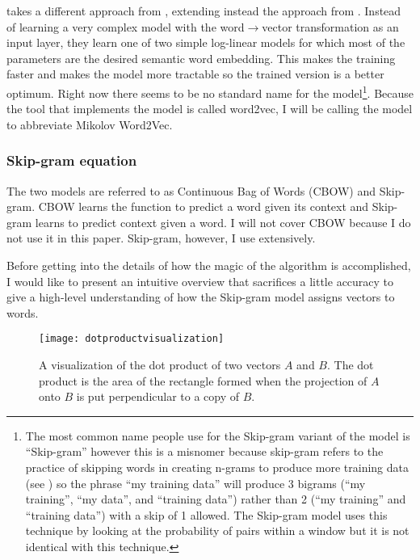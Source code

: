 \citep{Mikolov2013b} takes a different approach from \citep{Bengio2003},
extending instead the approach from \citep{Mikolov2007}. 
Instead of learning a very 
complex model with the word$\rightarrow$vector transformation as an input layer, they
learn one of two simple log-linear models for which most of the parameters
are the desired semantic word embedding. This makes the training faster and
makes the model more tractable so the trained version is a better optimum.
Right now there seems to be no standard name for the model\footnote{The most 
common name people use for the
Skip-gram variant of the model is ``Skip-gram'' however this is a misnomer 
because skip-gram refers to the practice of skipping words in creating n-grams
to produce more training data (see \citealt{Guthrie2006}) so the phrase 
``my training data'' will produce 3 bigrams (``my training'', ``my data'', 
and ``training data'') rather than 2 (``my training'' and ``training data'')
with a skip of 1 allowed. The Skip-gram model uses this technique by looking
at the probability of pairs within a window but it is not identical with this
technique.
}. Because the tool that implements the model is called word2vec, I will be 
calling the model \modelname{} to abbreviate 
Mikolov Word2Vec.

\subsubsection{Skip-gram equation}

The two models are referred to as Continuous Bag of Words (CBOW) and 
Skip-gram. CBOW learns the function to predict a word given its context and
Skip-gram learns to predict context given a word. I will not cover CBOW because
I do not use it in this paper. Skip-gram, however, I use extensively. 

Before getting into the details of how the magic of the algorithm is 
accomplished, I would like to present an intuitive overview that sacrifices 
a little accuracy to give a high-level understanding of how the Skip-gram model
assigns vectors to words.

\begin{figure}[tbp]
  \texttt{[image: dotproductvisualization]}
  \caption{A visualization of the dot product of two vectors $A$ and $B$. The 
  dot product is the area of the rectangle formed when the projection of $A$
  onto $B$ is put perpendicular to a copy of $B$.}
  \label{fig:dotproductvisualization}
\end{figure}

